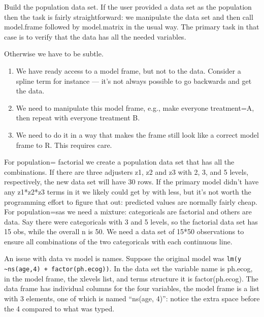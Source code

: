 \documentclass{article}
\newcommand{\code}[1]{\texttt{#1}}
\begin{document}


Build the population data set. 
If the user provided a data set as the population then the task is
fairly straightforward: we manipulate the data set and then call
model.frame followed by model.matrix in the usual way.
The primary task in that
case is to verify that the data has all the needed variables.

Otherwise we have to be subtle.
\begin{enumerate}
  \item We have ready access to a model frame, but not to the data.
    Consider a spline term for instance --- it's not always possible
    to go backwards and get the data.
  \item We need to manipulate this model frame, e.g., make everyone
    treatment=A, then repeat with everyone treatment B.
  \item We need to do it in a way that makes the frame still look
    like a correct model frame to R.  This requires care.
\end{enumerate}

For population= factorial we create a population data set that has all
the combinations.  If there are three adjusters z1, z2 and z3 with
2, 3, and 5 levels, respectively, the new data set will have 30
rows.  
If the primary model didn't have any z1*z2*z3 terms in it we
likely could get by with less, but it's not worth the programming effort
to figure that out: predicted values are normally fairly cheap.
For population=sas we need a mixture: categoricals are factorial and others
are data.  Say there were categoricals with 3 and 5 levels, so the factorial
data set has 15 obs, while the overall n is 50.  We need a data set of 15*50
observations to ensure all combinations of the two categoricals with each
continuous line.

An issue  with data vs model is names.  Suppose the original model was
\code{lm(y \textasciitilde ns(age,4) + factor(ph.ecog))}.
In the data set the variable name is ph.ecog, in the model frame,
the xlevels list, and terms structure it is factor(ph.ecog). 
The data frame has individual columns for the four variables, the model frame
is a list with 3 elements, one of which is named ``ns(age, 4)'': notice the
extra space before the 4 compared to what was typed.
\end{document}
